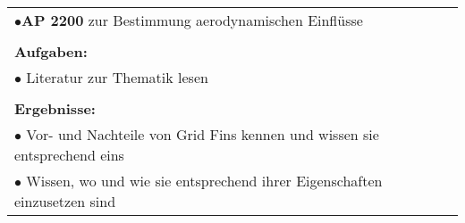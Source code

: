 \begin{table}[!h]
\begin{center}
\begin{tabular}{|p{35mm}||p{55mm}|p{50mm}||p{40mm}|}
			\multicolumn{4}{|p{150mm}|}{$\bullet$\textbf{AP 2200} zur Bestimmung aerodynamischen Einflüsse}\\
			\multicolumn{4}{|p{150mm}|}{}\\
			\multicolumn{4}{|p{150mm}|}{\textbf{Aufgaben:}}\\
			\multicolumn{4}{|p{150mm}|}{$\bullet$ Literatur zur Thematik lesen}\\
			\multicolumn{4}{|p{150mm}|}{}\\
			\multicolumn{4}{|p{150mm}|}{\textbf{Ergebnisse:}}\\
			\multicolumn{4}{|p{150mm}|}{$\bullet$ Vor- und Nachteile von Grid Fins kennen und wissen sie entsprechend eins}\\
			\multicolumn{4}{|p{150mm}|}{$\bullet$ Wissen, wo und wie sie entsprechend ihrer Eigenschaften einzusetzen sind}\\
			\hline
		\end{tabular}
	\end{center}
\end{table}
	
